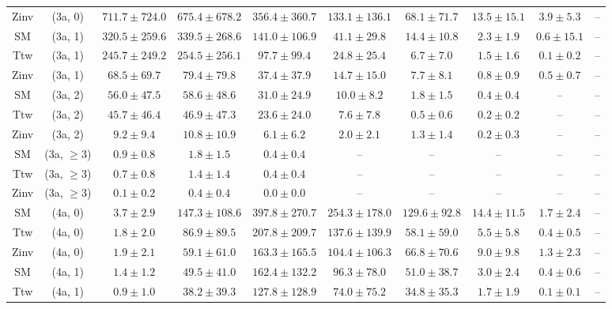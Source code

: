 \begin{table}[h!]
{\begin{tabular}{cccccccccc}
	Zinv & (3a, 0) & $711.7\pm 724.0$ & $675.4\pm 678.2$ & $356.4\pm 360.7$ & $133.1\pm 136.1$ & $68.1\pm 71.7$ & $13.5\pm 15.1$ & $3.9\pm 5.3$ & -- \\[0.5ex] 
	SM & (3a, 1) & $320.5\pm 259.6$ & $339.5\pm 268.6$ & $141.0\pm 106.9$ & $41.1\pm 29.8$ & $14.4\pm 10.8$ & $2.3\pm 1.9$ & $0.6\pm 15.1$ & -- \\[0.5ex] 
	Ttw & (3a, 1) & $245.7\pm 249.2$ & $254.5\pm 256.1$ & $97.7\pm 99.4$ & $24.8\pm 25.4$ & $6.7\pm 7.0$ & $1.5\pm 1.6$ & $0.1\pm 0.2$ & -- \\[0.5ex] 
	Zinv & (3a, 1) & $68.5\pm 69.7$ & $79.4\pm 79.8$ & $37.4\pm 37.9$ & $14.7\pm 15.0$ & $7.7\pm 8.1$ & $0.8\pm 0.9$ & $0.5\pm 0.7$ & -- \\[0.5ex] 
	SM & (3a, 2) & $56.0\pm 47.5$ & $58.6\pm 48.6$ & $31.0\pm 24.9$ & $10.0\pm 8.2$ & $1.8\pm 1.5$ & $0.4\pm 0.4$ & -- & -- \\[0.5ex] 
	Ttw & (3a, 2) & $45.7\pm 46.4$ & $46.9\pm 47.3$ & $23.6\pm 24.0$ & $7.6\pm 7.8$ & $0.5\pm 0.6$ & $0.2\pm 0.2$ & -- & -- \\[0.5ex] 
	Zinv & (3a, 2) & $9.2\pm 9.4$ & $10.8\pm 10.9$ & $6.1\pm 6.2$ & $2.0\pm 2.1$ & $1.3\pm 1.4$ & $0.2\pm 0.3$ & -- & -- \\[0.5ex] 
	SM & (3a, $\ge3$) & $0.9\pm 0.8$ & $1.8\pm 1.5$ & $0.4\pm 0.4$ & -- & -- & -- & -- & -- \\[0.5ex] 
	Ttw & (3a, $\ge3$) & $0.7\pm 0.8$ & $1.4\pm 1.4$ & $0.4\pm 0.4$ & -- & -- & -- & -- & -- \\[0.5ex] 
	Zinv & (3a, $\ge3$) & $0.1\pm 0.2$ & $0.4\pm 0.4$ & $0.0\pm 0.0$ & -- & -- & -- & -- & -- \\[0.5ex] 
	SM & (4a, 0) & $3.7\pm 2.9$ & $147.3\pm 108.6$ & $397.8\pm 270.7$ & $254.3\pm 178.0$ & $129.6\pm 92.8$ & $14.4\pm 11.5$ & $1.7\pm 2.4$ & -- \\[0.5ex] 
	Ttw & (4a, 0) & $1.8\pm 2.0$ & $86.9\pm 89.5$ & $207.8\pm 209.7$ & $137.6\pm 139.9$ & $58.1\pm 59.0$ & $5.5\pm 5.8$ & $0.4\pm 0.5$ & -- \\[0.5ex] 
	Zinv & (4a, 0) & $1.9\pm 2.1$ & $59.1\pm 61.0$ & $163.3\pm 165.5$ & $104.4\pm 106.3$ & $66.8\pm 70.6$ & $9.0\pm 9.8$ & $1.3\pm 2.3$ & -- \\[0.5ex] 
	SM & (4a, 1) & $1.4\pm 1.2$ & $49.5\pm 41.0$ & $162.4\pm 132.2$ & $96.3\pm 78.0$ & $51.0\pm 38.7$ & $3.0\pm 2.4$ & $0.4\pm 0.6$ & -- \\[0.5ex] 
	Ttw & (4a, 1) & $0.9\pm 1.0$ & $38.2\pm 39.3$ & $127.8\pm 128.9$ & $74.0\pm 75.2$ & $34.8\pm 35.3$ & $1.7\pm 1.9$ & $0.1\pm 0.1$ & -- \\[0.5ex] 

\end{tabular}}
\end{table}
